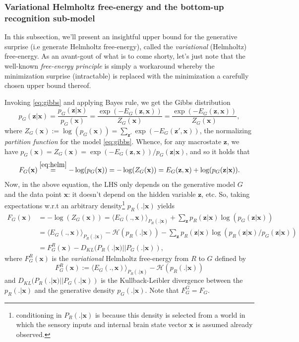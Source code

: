 \documentclass{article} %
\def\z{\mathbf{z}}
\def\x{\mathbf{x}}
\begin{document}
\subsubsection{Variational Helmholtz free-energy and the bottom-up recognition sub-model}
In this subsection, we'll present an insightful upper bound for the generative surprise (i.e generate Helmholtz free-energy), called the \textit{variational} (Helmholtz) free-energy. As an avant-gout of what is to come shorty, let's just note that the well-known \textit{free-energy principle} is simply a workaround whereby the minimization surprise (intractable) is replaced with the  minimization a carefully chosen upper bound thereof.

Invoking \eqref{eq:gibbs} and applying Bayes rule, we get the Gibbs
distribution
\begin{equation}
  p_G(\z|\x) = \frac{p_G(\z|\x)}{p_G(\x)} = \frac{\exp(-E_G(\z, \x))}{Z_G(\x)} = \frac{\exp(-E_G(\z, \x))}{Z_G(\x)},
\end{equation}
where $Z_G(\x) := \log(p_G(\x)) = \sum_{\z'}\exp(-E_G(\z',\x))$, the normalizing \textit{partition function} for the model \ref{eq:gibbs}.
Whence, for any macrostate $\z$, we have $p_G(\x) = Z_G(\x) = \exp(-E_G(\z, \x)) / p_G(\z|\x)$, and so it holds that
\begin{equation}
F_G(\x)\overset{\eqref{eq:helm}}{=} -\log(p_G(\x)) = -\log(Z_G(\x)) = E_G(\z, \x) + \log(p_G(\z|\x)).
\end{equation}
Now, in the above equation, the LHS only depends on the generative model $G$ and the data point $\x$:
it doesn't depend on the hidden variable $\z$, etc. So, taking expectations w.r.t an arbitrary
density\footnote{conditioning in $P_R(.|\x)$ is because this density is selected from a world in which the sensory inputs and internal brain
  state vector $\x$ is assumed already observed.} $p_R(.|\x)$ yields
\begin{equation}
  \begin{split}
    F_G(\x) &= -\log(Z_G(\x)) = \langle E_G(., \x)\rangle_{P_R(.|\x)} + \sum_{\z}p_R(\z|\x)\log(p_G(\z|\x))\\
    &= \langle E_G(., \x)\rangle_{P_R(.|\x)} - \mathcal H(p_R(.|\x)) - \sum_{\z}p_R(\z|\x)\log(p_R(\z|\x)/p_G(\z|\x))\\
    &= F^R_G(\x) - D_{KL}(P_R(.|\x) || P_G(.|\x)),
  \end{split}
  \label{eq:fe}
\end{equation}
where $F^R_G(\x)$ is the \textit{variational} Helmholtz free-energy from $R$ to $G$ defined by
\begin{equation}
  F^R_G(\x) := \langle E_G(., \x)\rangle_{P_R(.|\x)} - \mathcal H(p_R(.|\x))
\end{equation}
and $D_{KL}(P_R(.|\x) || P_G(.|\x))$ is the Kullback-Leibler divergence between the $p_R(.|\x)$ and the generative density $p_G(.|\x)$. Note that $F^G_G = F_G$.
\end{document}

